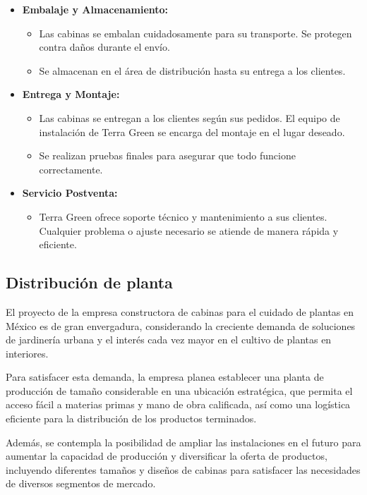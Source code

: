 \begin{itemize}
    \item \textbf{Embalaje y Almacenamiento:}
    \begin{itemize}
        \item Las cabinas se embalan cuidadosamente para su transporte. Se protegen contra daños durante el envío.
        \item Se almacenan en el área de distribución hasta su entrega a los clientes.
    \end{itemize}
    
    \item \textbf{Entrega y Montaje:}
    \begin{itemize}
        \item Las cabinas se entregan a los clientes según sus pedidos. El equipo de instalación de Terra Green se encarga del montaje en el lugar deseado.
        \item Se realizan pruebas finales para asegurar que todo funcione correctamente.
    \end{itemize}
    
    \item \textbf{Servicio Postventa:}
    \begin{itemize}
        \item Terra Green ofrece soporte técnico y mantenimiento a sus clientes. Cualquier problema o ajuste necesario se atiende de manera rápida y eficiente.
    \end{itemize}
\end{itemize}

\subsection{Distribución de planta}

El proyecto de la empresa constructora de cabinas para el cuidado de plantas en México es de gran envergadura, considerando la creciente demanda de soluciones de jardinería urbana y el interés cada vez mayor en el cultivo de plantas en interiores.

Para satisfacer esta demanda, la empresa planea establecer una planta de producción de tamaño considerable en una ubicación estratégica, que permita el acceso fácil a materias primas y mano de obra calificada, así como una logística eficiente para la distribución de los productos terminados.

Además, se contempla la posibilidad de ampliar las instalaciones en el futuro para aumentar la capacidad de producción y diversificar la oferta de productos, incluyendo diferentes tamaños y diseños de cabinas para satisfacer las necesidades de diversos segmentos de mercado.


